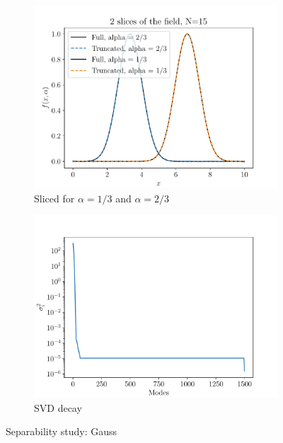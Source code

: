 \begin{figure}
\begin{subfigure}[t]{0.5\linewidth}
    \includegraphics[width=\linewidth]{Figures/Sliced_TruncatedField_15_Gauss.pdf}
    \caption{Sliced for $\alpha = 1/3$ and $\alpha = 2/3$}
\end{subfigure} 
  \begin{subfigure}[t]{0.5\linewidth}
    \centering
    \includegraphics[width=\linewidth]{Figures/SVD_Decay_Gauss.pdf}
    \caption{SVD decay}
\end{subfigure} 
\caption{Separability study: Gauss}
    \label{Separability_Gauss}
\end{figure}



